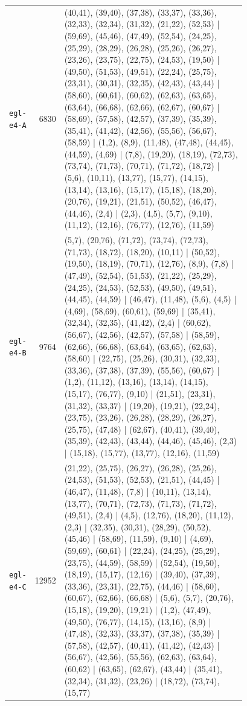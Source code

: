 \begin{landscape}
\begin{longtable}{lr>{\tiny\raggedright\arraybackslash}p{0.78\linewidth}}
\texttt{egl-e4-A} & 6830 & (40,41), (39,40), (37,38), (33,37), (33,36), (32,33), (32,34), (31,32), (21,22), (52,53) | (59,69), (45,46), (47,49), (52,54), (24,25), (25,29), (28,29), (26,28), (25,26), (26,27), (23,26), (23,75), (22,75), (24,53), (19,50) | (49,50), (51,53), (49,51), (22,24), (25,75), (23,31), (30,31), (32,35), (42,43), (43,44) | (58,60), (60,61), (60,62), (62,63), (63,65), (63,64), (66,68), (62,66), (62,67), (60,67) | (58,69), (57,58), (42,57), (37,39), (35,39), (35,41), (41,42), (42,56), (55,56), (56,67), (58,59) | (1,2), (8,9), (11,48), (47,48), (44,45), (44,59), (4,69) | (7,8), (19,20), (18,19), (72,73), (73,74), (71,73), (70,71), (71,72), (18,72) | (5,6), (10,11), (13,77), (15,77), (14,15), (13,14), (13,16), (15,17), (15,18), (18,20), (20,76), (19,21), (21,51), (50,52), (46,47), (44,46), (2,4) | (2,3), (4,5), (5,7), (9,10), (11,12), (12,16), (76,77), (12,76), (11,59) \\[2pt]
\texttt{egl-e4-B} & 9764 & (5,7), (20,76), (71,72), (73,74), (72,73), (71,73), (18,72), (18,20), (10,11) | (50,52), (19,50), (18,19), (70,71), (12,76), (8,9), (7,8) | (47,49), (52,54), (51,53), (21,22), (25,29), (24,25), (24,53), (52,53), (49,50), (49,51), (44,45), (44,59) | (46,47), (11,48), (5,6), (4,5) | (4,69), (58,69), (60,61), (59,69) | (35,41), (32,34), (32,35), (41,42), (2,4) | (60,62), (56,67), (42,56), (42,57), (57,58) | (58,59), (62,66), (66,68), (63,64), (63,65), (62,63), (58,60) | (22,75), (25,26), (30,31), (32,33), (33,36), (37,38), (37,39), (55,56), (60,67) | (1,2), (11,12), (13,16), (13,14), (14,15), (15,17), (76,77), (9,10) | (21,51), (23,31), (31,32), (33,37) | (19,20), (19,21), (22,24), (23,75), (23,26), (26,28), (28,29), (26,27), (25,75), (47,48) | (62,67), (40,41), (39,40), (35,39), (42,43), (43,44), (44,46), (45,46), (2,3) | (15,18), (15,77), (13,77), (12,16), (11,59) \\[2pt]
\texttt{egl-e4-C} & 12952 & (21,22), (25,75), (26,27), (26,28), (25,26), (24,53), (51,53), (52,53), (21,51), (44,45) | (46,47), (11,48), (7,8) | (10,11), (13,14), (13,77), (70,71), (72,73), (71,73), (71,72), (49,51), (2,4) | (4,5), (12,76), (18,20), (11,12), (2,3) | (32,35), (30,31), (28,29), (50,52), (45,46) | (58,69), (11,59), (9,10) | (4,69), (59,69), (60,61) | (22,24), (24,25), (25,29), (23,75), (44,59), (58,59) | (52,54), (19,50), (18,19), (15,17), (12,16) | (39,40), (37,39), (33,36), (23,31), (22,75), (44,46) | (58,60), (60,67), (62,66), (66,68) | (5,6), (5,7), (20,76), (15,18), (19,20), (19,21) | (1,2), (47,49), (49,50), (76,77), (14,15), (13,16), (8,9) | (47,48), (32,33), (33,37), (37,38), (35,39) | (57,58), (42,57), (40,41), (41,42), (42,43) | (56,67), (42,56), (55,56), (62,63), (63,64), (60,62) | (63,65), (62,67), (43,44) | (35,41), (32,34), (31,32), (23,26) | (18,72), (73,74), (15,77) \\[2pt]

\end{longtable}
\end{landscape}
